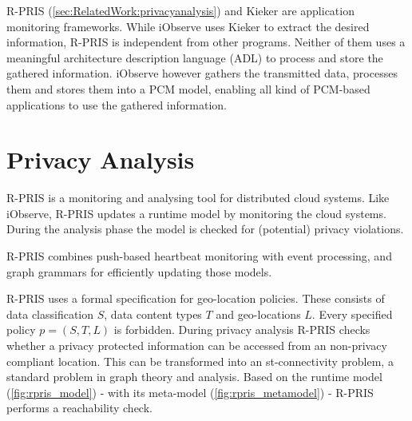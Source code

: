 R-PRIS (\autoref{sec:RelatedWork:privacyanalysis}) and Kieker are application monitoring frameworks. While iObserve uses Kieker to extract the desired information, R-PRIS is independent from other programs. Neither of them uses a meaningful architecture description language (ADL) to process and store the gathered information. iObserve however gathers the transmitted data, processes them and stores them into a PCM model, enabling all kind of PCM-based applications to use the gathered information.


\section{Privacy Analysis}
\label{sec:RelatedWork:privacyanalysis}

R-PRIS is a monitoring and analysing tool for distributed cloud systems. Like iObserve, R-PRIS updates a runtime model by monitoring the cloud systems. During the analysis phase the model is checked for (potential) privacy violations.

R-PRIS combines push-based heartbeat monitoring with event processing, and graph grammars for efficiently updating those models.\cite{Schmieders.}

R-PRIS uses a formal specification for geo-location policies. These consists of data classification $S$, data content types $T$ and geo-locations $L$. Every specified policy $p = (S, T, L)$ is forbidden.
During privacy analysis R-PRIS checks whether a privacy protected information can be accessed from an non-privacy compliant location. This can be transformed into an st-connectivity problem, a standard problem in graph theory and analysis. Based on the runtime model (\autoref{fig:rpris_model}) - with its meta-model (\autoref{fig:rpris_metamodel}) - R-PRIS performs a reachability check.\cite{Schmieders.2015} 


